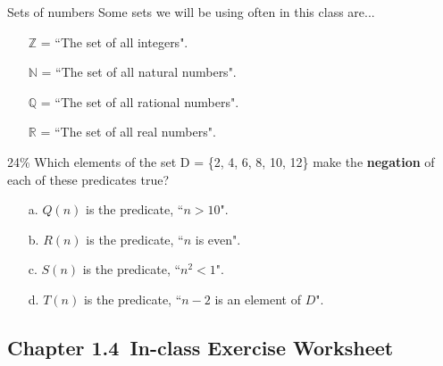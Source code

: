 \documentclass[a4paper,12pt]{book}
\newcommand{\laChapter}{1.4\ }
\begin{document}
        \begin{hint}{Sets of numbers}
            Some sets we will be using often in this class are...
            \begin{itemize}
                \item[] $\mathbb{Z}$ = ``The set of all integers".
                \item[] $\mathbb{N}$ = ``The set of all natural numbers".
                \item[] $\mathbb{Q}$ = ``The set of all rational numbers".
                \item[] $\mathbb{R}$ = ``The set of all real numbers".
            \end{itemize}
        \end{hint}

        \hrulefill
        \begin{question}{6}{24\%}
            Which elements of the set D = \{2, 4, 6, 8, 10, 12\} make the
            \textbf{negation} of each of these predicates true?
        \end{question}

        \begin{enumerate}
            \item[a.] $Q(n)$ is the predicate, ``$n > 10$".
            \item[b.] $R(n)$ is the predicate, ``$n$ is even".
            \item[c.] $S(n)$ is the predicate, ``$n^{2} < 1$".
            \item[d.] $T(n)$ is the predicate, ``$n-2$ is an element of $D$".
        \end{enumerate}

    
    \newpage
    \begin{center} \section*{Chapter \laChapter In-class Exercise Worksheet} \end{center}

    \iftoggle{answerkey}{
      \begin{answer} \begin{center} ANSWER KEY \end{center} \end{answer}
    }{}
\end{document}
